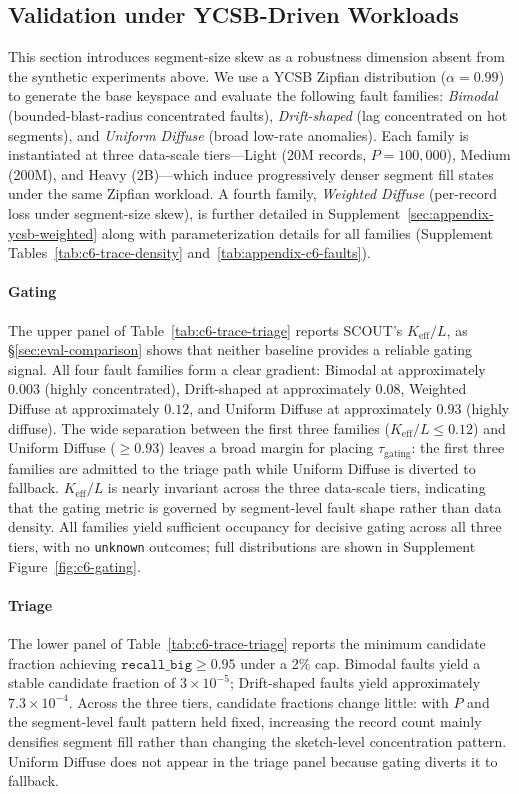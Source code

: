 \subsection{Validation under YCSB-Driven Workloads}
\label{sec:eval-ycsb}

This section introduces segment-size skew as a robustness
dimension absent from the synthetic experiments above.
We use a YCSB Zipfian distribution ($\alpha{=}0.99$) to
generate the base keyspace and evaluate the following fault families:
\emph{Bimodal} (bounded-blast-radius concentrated faults),
\emph{Drift-shaped} (lag concentrated on hot segments),
and \emph{Uniform Diffuse} (broad low-rate anomalies).
Each family is instantiated at three data-scale tiers---Light
(20M records, $P{=}100{,}000$), Medium (200M), and Heavy
(2B)---which induce progressively denser segment fill states
under the same Zipfian workload.
A fourth family, \emph{Weighted Diffuse} (per-record loss
under segment-size skew), is further detailed in
Supplement~\ref{sec:appendix-ycsb-weighted} along with
parameterization details for all families
(Supplement Tables~\ref{tab:c6-trace-density}
and~\ref{tab:appendix-c6-faults}).

\paragraph{Gating}
The upper panel of Table~\ref{tab:c6-trace-triage} reports
SCOUT's $K_{\text{eff}}/L$, as \S\ref{sec:eval-comparison}
shows that neither baseline provides a reliable gating signal.
All four fault families form a clear gradient: Bimodal at
approximately $0.003$ (highly concentrated), Drift-shaped at
approximately $0.08$, Weighted Diffuse at approximately
$0.12$, and Uniform Diffuse at approximately $0.93$ (highly
diffuse). The wide separation between the first three
families ($K_{\text{eff}}/L \le 0.12$) and Uniform Diffuse
(${\ge}0.93$) leaves a broad margin for placing
$\tau_{\text{gating}}$: the first three families are admitted to the triage path while Uniform Diffuse is diverted to fallback.
$K_{\text{eff}}/L$ is nearly invariant across the three
data-scale tiers, indicating that the gating metric is
governed by segment-level fault shape rather than data
density. All families yield sufficient occupancy for decisive
gating across all three tiers, with no \texttt{unknown}
outcomes; full distributions are shown in
Supplement Figure~\ref{fig:c6-gating}.

\paragraph{Triage}
The lower panel of Table~\ref{tab:c6-trace-triage} reports the
minimum candidate fraction achieving
$\texttt{recall\_big}\ge 0.95$ under a 2\% cap. Bimodal faults
yield a stable candidate fraction of $3{\times}10^{-5}$;
Drift-shaped faults yield approximately
$7.3{\times}10^{-4}$. Across the three tiers, candidate
fractions change little: with $P$ and the segment-level fault
pattern held fixed, increasing the record count mainly
densifies segment fill rather than changing the sketch-level
concentration pattern. Uniform Diffuse does not appear in the
triage panel because gating diverts it to fallback.

